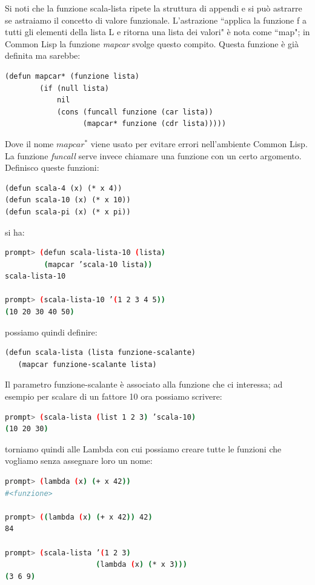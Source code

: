 \documentclass[a4paper,12pt, oneside]{book}
\begin{document}
Si noti che la funzione scala-lista ripete la struttura di appendi e si può astrarre se astraiamo il
concetto di valore funzionale. L’astrazione “applica la funzione f a tutti gli elementi della lista L e ritorna una
lista dei valori" è nota come “map"; in Common Lisp la funzione \textit{mapcar }svolge
questo compito. Questa funzione è già definita ma sarebbe:
\begin{verbatim}
(defun mapcar* (funzione lista)
        (if (null lista)
            nil
            (cons (funcall funzione (car lista))
                  (mapcar* funzione (cdr lista)))))
\end{verbatim}
Dove il nome $mapcar^*$ viene usato per evitare errori nell’ambiente Common Lisp. La funzione \textit{funcall} serve invece chiamare una funzione con un certo argomento.\\
Definisco queste funzioni:
\begin{verbatim}
(defun scala-4 (x) (* x 4))
(defun scala-10 (x) (* x 10))
(defun scala-pi (x) (* x pi))
\end{verbatim}
si ha:
\begin{shaded}
\begin{lstlisting}[language=bash]
prompt> (defun scala-lista-10 (lista)
         (mapcar ’scala-10 lista))
scala-lista-10

prompt> (scala-lista-10 ’(1 2 3 4 5))
(10 20 30 40 50)
\end{lstlisting}
\end{shaded}
possiamo quindi definire:
\begin{verbatim}
(defun scala-lista (lista funzione-scalante)
   (mapcar funzione-scalante lista)
\end{verbatim}
Il parametro funzione-scalante è associato alla funzione che ci interessa; ad esempio per scalare di un fattore 10 ora possiamo scrivere:
\begin{shaded}
\begin{lstlisting}[language=bash]
prompt> (scala-lista (list 1 2 3) ’scala-10)
(10 20 30)
\end{lstlisting}
\end{shaded}
torniamo quindi alle Lambda con cui possiamo creare tutte le funzioni che
vogliamo senza assegnare loro un nome:
\begin{shaded}
\begin{lstlisting}[language=bash]
prompt> (lambda (x) (+ x 42))
#<funzione>

prompt> ((lambda (x) (+ x 42)) 42)
84

prompt> (scala-lista ’(1 2 3)
                     (lambda (x) (* x 3)))
(3 6 9)
\end{lstlisting}
\end{shaded}
\end{document}
